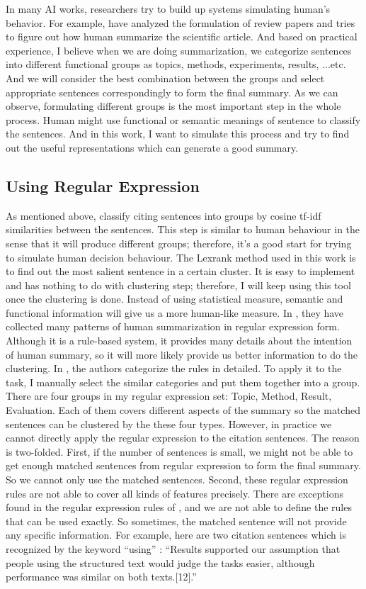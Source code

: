 \documentclass[hyp]{socreport}
\begin{document}
In many AI works, researchers try to build up systems simulating human's behavior. For example, \citep{kokil2010} have analyzed the formulation of review papers and tries to figure out how human summarize the scientific article. And based on practical experience, I believe when we are doing summarization, we categorize sentences into different functional groups as topics, methods, experiments, results, ...etc. And we will consider the best combination between the groups and select appropriate sentences correspondingly to form the final summary. As we can observe, formulating different groups is the most important step in the whole process. Human might use functional or semantic meanings of sentence to classify the sentences. And in this work, I want to simulate this process and try to find out the useful representations which can generate a good summary.

\subsection{Using Regular Expression}

As mentioned above, \citep{qazvinian2008} classify citing sentences into groups by cosine tf-idf similarities between the sentences. This step is similar to human behaviour in the sense that it will produce different groups; therefore, it's a good start for trying to simulate human decision behaviour. The Lexrank method used in this work is to find out the most salient sentence in a certain cluster. It is easy to implement and has nothing to do with clustering step; therefore, I will keep using this tool once the clustering is done. Instead of using statistical measure, semantic and functional information will give us a more human-like measure. In \citep{kokil2010}, they have collected many patterns of human summarization in regular expression form. Although it is a rule-based system, it provides many details about the intention of human summary, so it will more likely provide us better information to do the clustering. In  \citep{kokil2010}, the authors categorize the rules in detailed. To apply it to the task, I manually select the similar categories and put them together into a group. There are four groups in my regular expression set: Topic, Method, Result, Evaluation. Each of them covers different aspects of the summary so the matched sentences can be clustered by the these four types.  However, in practice we cannot directly apply the regular expression to the citation sentences. The reason is two-folded. First, if the number of sentences is small, we might not be able to get enough matched sentences from regular expression to form the final summary. So we cannot only use the matched sentences. Second, these regular expression rules are not able to cover all kinds of features precisely. There are exceptions found in the regular expression rules of \citep{kokil2010}, and we are not able to define the rules that can be used exactly. So sometimes, the matched sentence will not provide any specific information. For example, here are two citation sentences which is recognized by the keyword “using” :
“Results supported our assumption that people using the structured text would judge the tasks easier, although performance was similar on both texts.[12].”
\end{document}
